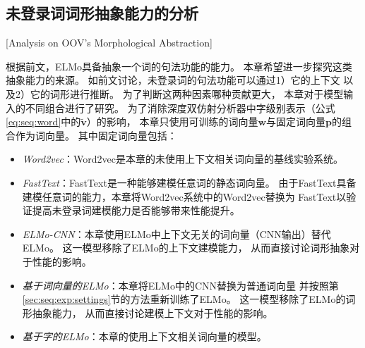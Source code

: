 \subsection{未登录词词形抽象能力的分析}[Analysis on OOV's Morphological Abstraction]\label{sec:seq:anal:ablation}

根据前文，ELMo具备抽象一个词的句法功能的能力。
本章希望进一步探究这类抽象能力的来源。
如前文讨论，未登录词的句法功能可以通过1）它的上下文
以及2）它的词形进行推断。
为了判断这两种因素哪种贡献更大，
本章对于模型输入的不同组合进行了研究。
为了消除深度双仿射分析器中字级别表示（公式\ref{eq:seq:word}中的$\tilde{\mathbf{v}}$）的影响，
本章只使用可训练的词向量$\mathbf{w}$与固定词向量$\mathbf{p}$的组合作为词向量。
其中固定词向量包括：
\begin{itemize}
	\item \textit{Word2vec}：Word2vec是本章的未使用上下文相关词向量的基线实验系统。
	\item \textit{FastText}：FastText\cite{Q17-1010}是一种能够建模任意词的静态词向量。
	由于FastText具备建模任意词的能力，本章将Word2vec系统中的Word2vec替换为
	FastText以验证提高未登录词建模能力是否能够带来性能提升。
	\item \textit{ELMo-CNN}：本章使用ELMo中上下文无关的词向量（CNN输出）替代ELMo。
	这一模型移除了ELMo的上下文建模能力，
	从而直接讨论词形抽象对于性能的影响。
	\item \textit{基于词向量的ELMo}：本章将ELMo中的CNN替换为普通词向量
	并按照第\ref{sec:seq:exp:settings}节的方法重新训练了ELMo。
	这一模型移除了ELMo的词形抽象能力，
	从而直接讨论建模上下文对于性能的影响。
	\item \textit{基于字的ELMo}：本章的使用上下文相关词向量的模型。
\end{itemize}

